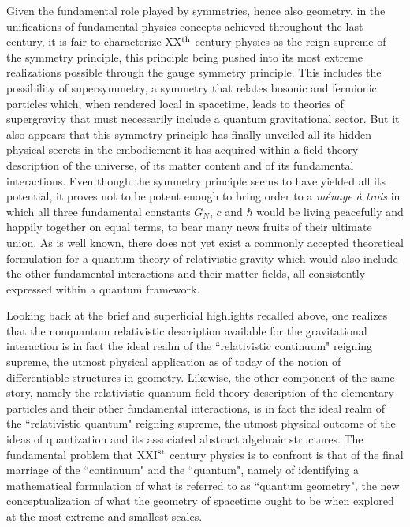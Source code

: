 \documentclass[a4paper,11pt]{article}
\begin{document}
Given the fundamental role played by symmetries, hence also geometry, in the
unifications of fundamental physics concepts achieved throughout the last
century, it is fair to characterize XX$^{\rm th}$ century
physics as the reign supreme of the symmetry principle, this principle being 
pushed into its most extreme realizations possible through the gauge symmetry
principle. This includes the possibility of supersymmetry, a symmetry that
relates bosonic and fermionic particles which, when rendered local in 
spacetime, leads to theories of supergravity that must necessarily include
a quantum gravitational sector. But it also appears that this symmetry 
principle has finally unveiled all its hidden physical secrets in the 
embodiement it has acquired within a field theory description of the 
universe, of its matter content and of its fundamental interactions. 
Even though the symmetry principle seems to have yielded all its potential, 
it proves not to be potent enough to bring order to a 
{\sl m\'enage \`a trois\/} in which all three fundamental constants 
$G_N$, $c$ and $\hbar$ would be living peacefully and happily together on 
equal terms, to bear many news fruits of their ultimate union.
As is well known, there does not yet exist a commonly accepted
theoretical formulation for a quantum theory of relativistic gravity
which would also include the other fundamental interactions and their
matter fields, all consistently expressed within a quantum framework.

Looking back at the brief and superficial highlights recalled above,
one realizes that the nonquantum relativistic description available for
the gra\-vi\-ta\-tional interaction is in fact the ideal realm of the
``relativistic continuum" reigning supreme, the utmost physical application 
as of today of the notion of differentiable structures in geometry. Likewise, 
the other component of the same story, namely the relativistic quantum field 
theory description of the elementary particles and their other fundamental 
interactions, is in fact the ideal realm of the ``relativistic quantum" 
reigning supreme, the utmost physical outcome of the ideas of quantization 
and its associated abstract algebraic structures. The fundamental problem 
that XXI$^{\rm st}$ century physics is to confront is that of the final 
marriage of the ``continuum" and the ``quantum", namely of identifying 
a mathematical formulation of what is referred to as ``quantum geometry", 
the new conceptualization of what the geometry of spacetime ought to be when
explored at the most extreme and smallest scales.
\end{document}
